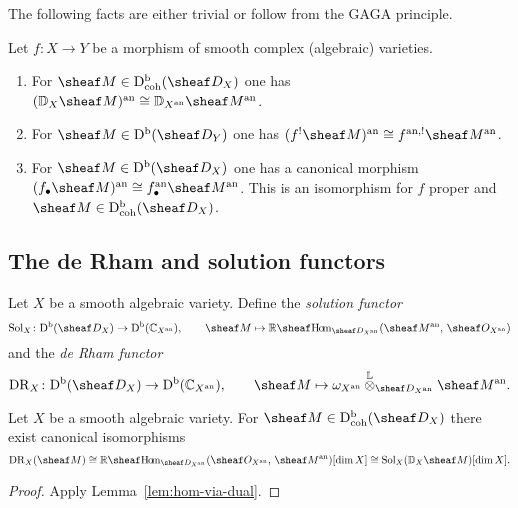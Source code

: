 \documentclass[number-in-sections,a4paper]{notes}
\begin{document}
The following facts are either trivial or follow from the GAGA principle.

\begin{Facts}
    Let $f\colon X \to Y$ be a morphism of smooth complex (algebraic) varieties.
    \begin{enumerate}
        \item For $\sheaf M \in \catDbDModcoh{X}$ one has $(\DD_X\sheaf M)^\an \cong \DD_{X^\an}\sheaf  M^\an$.
        \item For $\sheaf M \in \catDbDMod{Y}$ one has $(f^!\sheaf M)^\an \cong f^{\an,!}\sheaf M^\an$.
        \item For $\sheaf M \in \catDbDMod{X}$ one has a canonical morphism $(f_\bullet\sheaf M)^\an \cong f^{\an}_\bullet\sheaf M^\an$.
            This is an isomorphism for $f$ proper and $\sheaf M \in \catDbDModcoh{X}$.
    \end{enumerate}
\end{Facts}

\subsection{The de Rham and solution functors}

\begin{Definition}
    Let $X$ be a smooth algebraic variety.
    Define the \emph{solution functor}
    \[
        \Sol_X\colon \catDbDMod{X} \to \catDbCMod{X^\an}, \qquad \sheaf M \mapsto \RsheafHom_{\sD_{X^\an}}(\sheaf M^\an,\, \sO_{X^\an})
    \]
    and the \emph{de Rham functor}
    \[
        \DR_X\colon \catDbDMod{X} \to \catDbCMod{X^\an}, \qquad \sheaf M \mapsto \canon_{X^\an} \Lotimes_{\sD_{X^\an}} \sheaf M^\an.
    \]
\end{Definition}

\begin{Lemma}
    Let $X$ be a smooth algebraic variety.
    For $\sheaf M \in \catDbDModcoh{X}$ there exist canonical isomorphisms
    \[
        \DR_X(\sheaf M) \cong
        \sheafRHom_{\sD_{X^\an}}(\sO_{X^\an},\, \sheaf M^\an)[\dim X] \cong
        \Sol_X(\DD_X\sheaf M)[\dim X].
    \]
\end{Lemma}

\begin{proof}
    Apply Lemma~\ref{lem:hom-via-dual}.
\end{proof}
\end{document}
